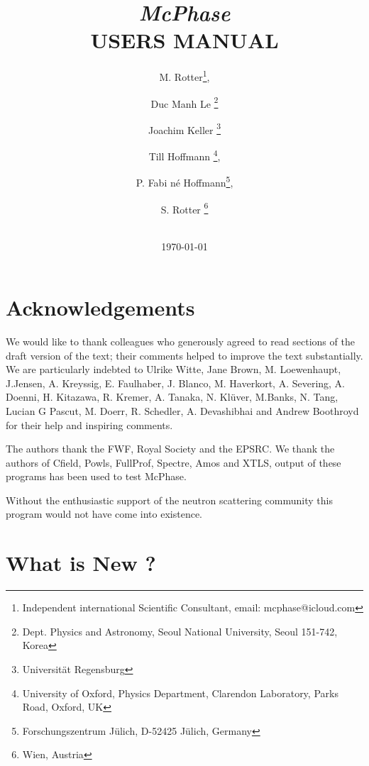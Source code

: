 \documentclass[twoside]{article}
\begin{document}
 \title{ {\Huge \bf \em McPhase} \\
 \vspace{1cm} 
{\bf   USERS MANUAL}\\
  \vspace{2cm} 
\vspace{3cm}}

\date {\vspace{2cm} 
 \vspace{2cm}
 \\ \today}

\author{M. Rotter\thanks{Independent international Scientific Consultant, email: mcphase@icloud.com}, 
\and Duc Manh Le \thanks{Dept. Physics and Astronomy, Seoul National University, Seoul 151-742, Korea}
\and Joachim Keller \thanks{Universit\"at Regensburg}
\and Till Hoffmann  \thanks{University of Oxford, Physics Department, Clarendon Laboratory, Parks Road, Oxford, UK},
\and P. Fabi n\'e Hoffmann\thanks{Forschungszentrum J\"ulich, D-52425 J\"ulich, Germany},
\and S. Rotter \thanks{Wien, Austria}
}


\maketitle
\clearpage

\section*{Acknowledgements}

We would like to thank colleagues who generously agreed to read sections of the draft version
of the text; their comments helped to improve the text substantially. We are particularly indebted to
Ulrike Witte, Jane Brown, M. Loewenhaupt, J.Jensen, A. Kreyssig, E. Faulhaber,
J. Blanco, M. Haverkort, A. Severing,
A. Doenni, H. Kitazawa, R. Kremer, A. Tanaka, N. Kl\"uver, 
M.Banks, N. Tang, Lucian G Pascut, M. Doerr, R. Schedler, A. Devashibhai
 and Andrew Boothroyd for their help and inspiring comments.

The authors thank the FWF, Royal Society and the EPSRC.
We thank the authors of Cfield, Powls, FullProf, Spectre, Amos and XTLS, output 
of these programs has been used to test McPhase. 

Without the enthusiastic support of the neutron scattering 
community this program would not have come into existence. 

\section*{What is New ?}
\end{document}
